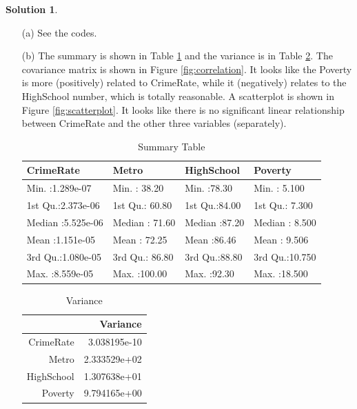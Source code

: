 \documentclass[11pt,letterpaper,english,oneside]{article} %
\theoremstyle{definition} %
\newtheorem{solution}{Solution}
\newenvironment{sol}{\begin{solution}\hspace{0pt}}{\end{solution}}
\begin{document}
    \begin{sol}
    \begin{itemize}
        \item[(a)] See the codes.

        \item[(b)] 
        The summary is shown in Table \ref{table:summary} and the variance is in Table \ref{table:var}. The covariance matrix is shown in Figure \ref{fig:correlation}. It looks like the Poverty is more (positively) related to CrimeRate, while it (negatively) relates to the HighSchool number, which is totally reasonable. A scatterplot is shown in Figure \ref{fig:scatterplot}. It looks like there is no significant linear relationship between CrimeRate and the other three variables (separately).
        \begin{table}[h]
\centering
\begin{tabular}{llll}
  \hline
  CrimeRate &     Metro &   HighSchool &    Poverty \\ 
  \hline
Min.   :1.289e-07   & Min.   : 38.20   & Min.   :78.30   & Min.   : 5.100   \\ 
  1st Qu.:2.373e-06   & 1st Qu.: 60.80   & 1st Qu.:84.00   & 1st Qu.: 7.300   \\ 
  Median :5.525e-06   & Median : 71.60   & Median :87.20   & Median : 8.500   \\ 
  Mean   :1.151e-05   & Mean   : 72.25   & Mean   :86.46   & Mean   : 9.506   \\ 
  3rd Qu.:1.080e-05   & 3rd Qu.: 86.80   & 3rd Qu.:88.80   & 3rd Qu.:10.750   \\ 
  Max.   :8.559e-05   & Max.   :100.00   & Max.   :92.30   & Max.   :18.500   \\ 
   \hline
\end{tabular}
\caption{Summary Table} 
\label{table:summary}
\end{table}
\begin{table}[h]
\centering
\begin{tabular}{rr}
  \hline
 & Variance \\ 
  \hline
CrimeRate     &    3.038195e-10 \\
Metro         &    2.333529e+02 \\
HighSchool    &    1.307638e+01 \\
Poverty       &    9.794165e+00 \\
   \hline
\end{tabular}
\caption{Variance} 
\label{table:var}
\end{table}
    

\end{itemize}
\end{sol}
\end{document}
